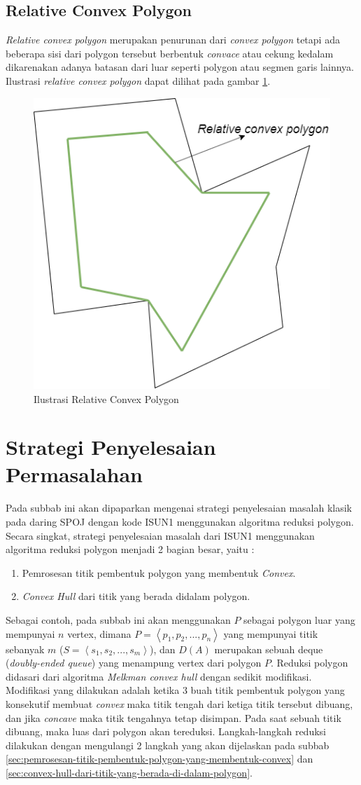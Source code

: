 \subsection{Relative Convex Polygon}
\textit{Relative convex polygon} merupakan penurunan dari \textit{convex polygon} tetapi ada beberapa sisi dari polygon tersebut berbentuk \textit{convace} atau cekung kedalam dikarenakan adanya batasan dari luar seperti polygon atau segmen garis lainnya. Ilustrasi \textit{relative convex polygon} dapat dilihat pada gambar \ref{fig:ilustrasi-relative-convex-polygon}.
\begin{figure}[!h]
    \Centering
    \includegraphics[width=0.5\columnwidth]{bab2/img/ilustrasi-relative-convex-polygon}
    \caption{Ilustrasi Relative Convex Polygon}
    \label{fig:ilustrasi-relative-convex-polygon}
\end{figure}
\section{Strategi Penyelesaian Permasalahan}
Pada subbab ini akan dipaparkan mengenai strategi penyelesaian masalah klasik pada daring SPOJ dengan kode ISUN1 menggunakan algoritma reduksi polygon. Secara singkat, strategi penyelesaian masalah dari ISUN1 menggunakan algoritma reduksi polygon menjadi 2 bagian besar, yaitu :
\begin{enumerate}
    \item Pemrosesan titik pembentuk polygon yang membentuk \textit{Convex}.
    \item \textit{Convex Hull} dari titik yang berada didalam polygon.
\end{enumerate}
Sebagai contoh, pada subbab ini akan menggunakan $P$ sebagai polygon luar yang mempunyai $n$ vertex, dimana $P = \left \langle p_1, p_2, ..., p_n \right \rangle$ yang mempunyai titik sebanyak $m$ ($S = \left \langle s_1, s_2, ..., s_m \right \rangle$), dan $D(A)$ merupakan sebuah deque (\textit{doubly-ended queue}) yang menampung vertex dari polygon $P$. Reduksi polygon didasari dari algoritma \textit{Melkman convex hull} dengan sedikit modifikasi. Modifikasi yang dilakukan adalah ketika 3 buah titik pembentuk polygon yang konsekutif membuat \textit{convex} maka titik tengah dari ketiga titik tersebut dibuang, dan jika \textit{concave} maka titik tengahnya tetap disimpan. Pada saat sebuah titik dibuang, maka luas dari polygon akan tereduksi. Langkah-langkah reduksi dilakukan dengan mengulangi 2 langkah yang akan dijelaskan pada subbab \ref{sec:pemrosesan-titik-pembentuk-polygon-yang-membentuk-convex} dan \ref{sec:convex-hull-dari-titik-yang-berada-di-dalam-polygon}.


